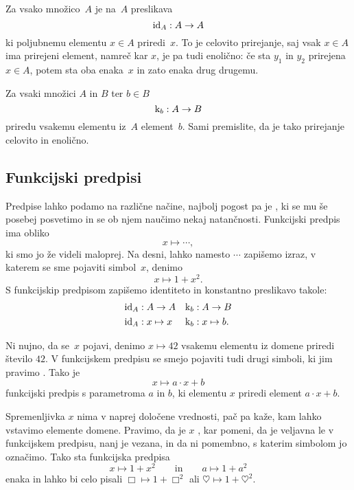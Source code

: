 Za vsako množico~$A$ je  na~$A$ preslikava
%
\begin{equation*}
  \id[A] : A \to A
\end{equation*}
%
ki poljubnemu elementu $x \in A$ priredi~$x$. To je celovito prirejanje, saj vsak
$x \in A$ ima prirejeni element, namreč kar $x$, je pa tudi enolično: če sta $y_1$ in
$y_2$ prirejena $x \in A$, potem sta oba enaka~$x$ in zato enaka drug drugemu.

Za vsaki množici $A$ in $B$ ter $b \in B$ 
%
\begin{equation*}
  \konst{b} : A \to B
\end{equation*}
%
priredu vsakemu elementu iz~$A$ element~$b$. Sami premislite, da je tako prirejanje
celovito in enolično.

\subsection{Funkcijski predpisi}
\label{sec:funkcijski-predpisi}

Predpise lahko podamo na različne načine, najbolj pogost pa je , ki
se mu še posebej posvetimo in se ob njem naučimo nekaj natančnosti. Funkcijski predpis ima
obliko
%
\begin{equation*}
  x \mapsto \cdots,
\end{equation*}
%
ki smo jo že videli maloprej. Na desni, lahko namesto $\cdots$ zapišemo izraz, v katerem
se sme pojaviti simbol~$x$, denimo
%
\begin{equation*}
  x \mapsto 1 + x^2.
\end{equation*}
%
S funkcijskip predpisom zapišemo identiteto in konstantno preslikavo takole:
%
\begin{align*}
  \id[A] &: A \to A
  &
  \konst{b} &: A \to B
  \\
  \id[A] &: x \mapsto x
  &
  \konst{b} &: x \mapsto b.
\end{align*}

Ni nujno, da se~$x$ pojavi, denimo $x \mapsto 42$ vsakemu elementu iz domene priredi
število $42$. V funkcijskem predpisu se smejo pojaviti tudi drugi simboli, ki jim
pravimo . Tako je
%
\begin{equation*}
  x \mapsto a \cdot x + b
\end{equation*}
%
funkcijski predpis s parametroma $a$ in $b$, ki elementu $x$ priredi element $a \cdot x + b$.

Spremenljivka $x$ nima v naprej določene vrednosti, pač pa kaže, kam lahko vstavimo
elemente domene. Pravimo, da je $x$ , kar pomeni, da je veljavna
le v funkcijskem predpisu, nanj je vezana, in da ni pomembno, s katerim simbolom jo
označimo. Tako sta funkcijska predpisa
%
\begin{equation*}
  x \mapsto 1 + x^2
  \qquad\text{in}\qquad
  a \mapsto 1 + a^2
\end{equation*}
%
enaka in lahko bi celo pisali $\Box \mapsto 1 + \Box^2$ ali
$\heartsuit \mapsto 1 + \heartsuit^2$.

